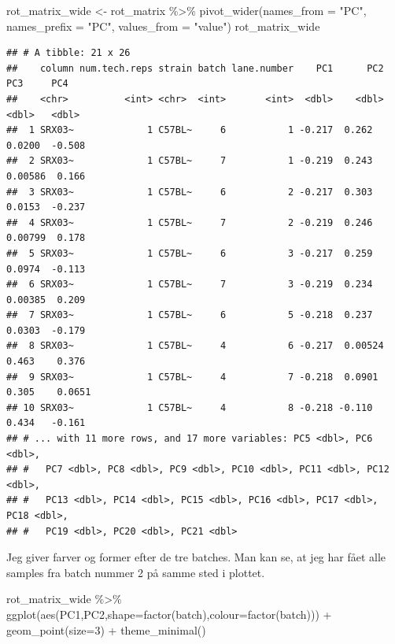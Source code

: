 \documentclass[
]{book}
\newenvironment{Shaded}{\begin{snugshade}}{\end{snugshade}}
\newcommand{\AttributeTok}[1]{\textcolor[rgb]{0.77,0.63,0.00}{#1}}
\newcommand{\DecValTok}[1]{\textcolor[rgb]{0.00,0.00,0.81}{#1}}
\newcommand{\FunctionTok}[1]{\textcolor[rgb]{0.00,0.00,0.00}{#1}}
\newcommand{\NormalTok}[1]{#1}
\newcommand{\OtherTok}[1]{\textcolor[rgb]{0.56,0.35,0.01}{#1}}
\newcommand{\SpecialCharTok}[1]{\textcolor[rgb]{0.00,0.00,0.00}{#1}}
\newcommand{\StringTok}[1]{\textcolor[rgb]{0.31,0.60,0.02}{#1}}
\begin{document}
\begin{Shaded}
\begin{Highlighting}[]
\NormalTok{rot\_matrix\_wide }\OtherTok{\textless{}{-}}\NormalTok{ rot\_matrix }\SpecialCharTok{\%\textgreater{}\%} 
  \FunctionTok{pivot\_wider}\NormalTok{(}\AttributeTok{names\_from =} \StringTok{"PC"}\NormalTok{, }\AttributeTok{names\_prefix =} \StringTok{"PC"}\NormalTok{, }\AttributeTok{values\_from =} \StringTok{"value"}\NormalTok{)}
\NormalTok{rot\_matrix\_wide}
\end{Highlighting}
\end{Shaded}

\begin{verbatim}
## # A tibble: 21 x 26
##    column num.tech.reps strain batch lane.number    PC1      PC2     PC3     PC4
##    <chr>          <int> <chr>  <int>       <int>  <dbl>    <dbl>   <dbl>   <dbl>
##  1 SRX03~             1 C57BL~     6           1 -0.217  0.262   0.0200  -0.508 
##  2 SRX03~             1 C57BL~     7           1 -0.219  0.243   0.00586  0.166 
##  3 SRX03~             1 C57BL~     6           2 -0.217  0.303   0.0153  -0.237 
##  4 SRX03~             1 C57BL~     7           2 -0.219  0.246   0.00799  0.178 
##  5 SRX03~             1 C57BL~     6           3 -0.217  0.259   0.0974  -0.113 
##  6 SRX03~             1 C57BL~     7           3 -0.219  0.234   0.00385  0.209 
##  7 SRX03~             1 C57BL~     6           5 -0.218  0.237   0.0303  -0.179 
##  8 SRX03~             1 C57BL~     4           6 -0.217  0.00524 0.463    0.376 
##  9 SRX03~             1 C57BL~     4           7 -0.218  0.0901  0.305    0.0651
## 10 SRX03~             1 C57BL~     4           8 -0.218 -0.110   0.434   -0.161 
## # ... with 11 more rows, and 17 more variables: PC5 <dbl>, PC6 <dbl>,
## #   PC7 <dbl>, PC8 <dbl>, PC9 <dbl>, PC10 <dbl>, PC11 <dbl>, PC12 <dbl>,
## #   PC13 <dbl>, PC14 <dbl>, PC15 <dbl>, PC16 <dbl>, PC17 <dbl>, PC18 <dbl>,
## #   PC19 <dbl>, PC20 <dbl>, PC21 <dbl>
\end{verbatim}

Jeg giver farver og former efter de tre batches. Man kan se, at jeg har fået alle samples fra batch nummer 2 på samme sted i plottet.

\begin{Shaded}
\begin{Highlighting}[]
\NormalTok{rot\_matrix\_wide }\SpecialCharTok{\%\textgreater{}\%}
  \FunctionTok{ggplot}\NormalTok{(}\FunctionTok{aes}\NormalTok{(PC1,PC2,}\AttributeTok{shape=}\FunctionTok{factor}\NormalTok{(batch),}\AttributeTok{colour=}\FunctionTok{factor}\NormalTok{(batch))) }\SpecialCharTok{+} 
  \FunctionTok{geom\_point}\NormalTok{(}\AttributeTok{size=}\DecValTok{3}\NormalTok{) }\SpecialCharTok{+}
  \FunctionTok{theme\_minimal}\NormalTok{()}
\end{Highlighting}
\end{Shaded}
\end{document}
